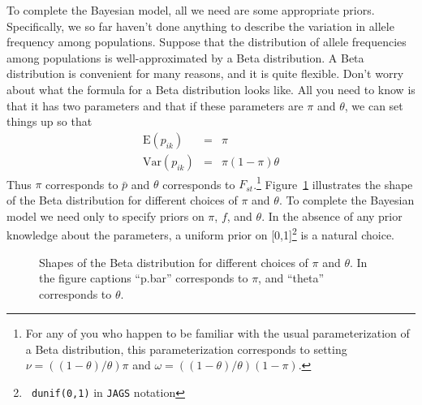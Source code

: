 To complete the Bayesian model, all we need are some appropriate
priors. Specifically, we so far haven't done anything to describe the
variation in allele frequency among populations. Suppose that the
distribution of allele frequencies among populations is
well-approximated by a Beta distribution. A Beta
distribution is convenient for many reasons, and it is quite
flexible. Don't worry about what the formula for a Beta distribution
looks like. All you need to know is that it has two parameters and
that if these parameters are $\pi$ and $\theta$, we can set things up
so that
\begin{eqnarray*}
\mbox{E}(p_{ik}) &=& \pi \\
\mbox{Var}(p_{ik}) &=& \pi(1-\pi)\theta
\end{eqnarray*}
Thus $\pi$ corresponds to $\bar p$ and $\theta$ corresponds to
$F_{st}$.\footnote{For any of you who happen to be familiar with the
usual parameterization of a Beta distribution, this parameterization
corresponds to setting $\nu = ((1-\theta)/\theta)\pi$ and $\omega =
((1-\theta)/\theta)(1-\pi)$.} Figure~\ref{fig:beta} illustrates the
shape of the Beta distribution for different choices of $\pi$ and
$\theta$. To complete the Bayesian model we need only to specify
priors on $\pi$, $f$, and $\theta$. In the absence of any prior
knowledge about the parameters, a uniform prior on [0,1]\footnote{{\tt
dunif(0,1)} in {\tt JAGS} notation} is a natural choice.
\begin{figure}
\caption{Shapes of the Beta distribution for different choices of
  $\pi$ and $\theta$. In the figure captions ``p.bar'' corresponds to $\pi$,
  and ``theta'' corresponds to $\theta$.}\label{fig:beta}
\end{figure}

